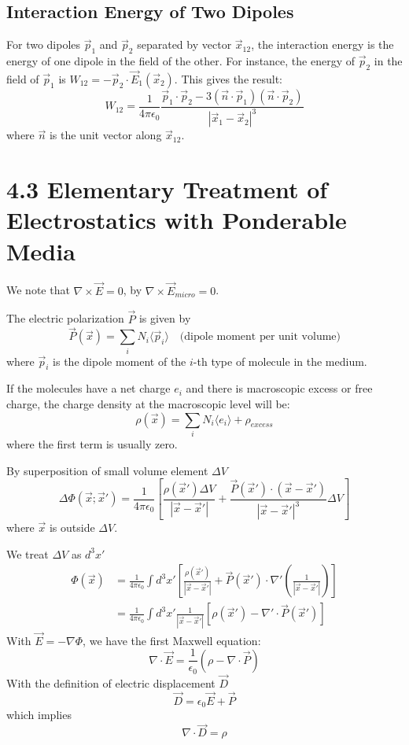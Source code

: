 \documentclass{article}
\begin{document}
	\subsection{Interaction Energy of Two Dipoles}
	For two dipoles $\vec{p}_1$ and $\vec{p}_2$ separated by vector $\vec{x}_{12}$, the interaction energy is the energy of one dipole in the field of the other. For instance, the energy of $\vec{p}_2$ in the field of $\vec{p}_1$ is $W_{12} = -\vec{p}_2 \cdot \vec{E}_1(\vec{x}_2)$. This gives the result:
	\[
	W_{12} = \frac{1}{4\pi\epsilon_0} \frac{\vec{p}_1 \cdot \vec{p}_2 - 3(\vec{n} \cdot \vec{p}_1)(\vec{n} \cdot \vec{p}_2)}{|\vec{x}_1 - \vec{x}_2|^3}
	\]
	where $\vec{n}$ is the unit vector along $\vec{x}_{12}$.
	\section*{4.3 Elementary Treatment of Electrostatics with Ponderable Media}
	
	We note that $\nabla \times \vec{E} = 0$, by $\nabla \times \vec{E}_{micro} = 0$.
	
	The electric polarization $\vec{P}$ is given by
	\[
	\vec{P}(\vec{x}) = \sum_{i} N_i \langle \vec{p}_i \rangle \quad \text{(dipole moment per unit volume)}
	\]
	where $\vec{p}_i$ is the dipole moment of the $i$-th type of molecule in the medium.
	
	If the molecules have a net charge $e_i$ and there is macroscopic excess or free charge, the charge density at the macroscopic level will be:
	\[
	\rho(\vec{x}) = \sum_{i} N_i \langle e_i \rangle + \rho_{excess}
	\]
	where the first term is usually zero.
	
	By superposition of small volume element $\Delta V$
	\[
	\Delta \Phi(\vec{x}; \vec{x}') = \frac{1}{4\pi\epsilon_0} \left[ \frac{\rho(\vec{x}') \Delta V}{|\vec{x}-\vec{x}'|} + \frac{\vec{P}(\vec{x}') \cdot (\vec{x}-\vec{x}')}{|\vec{x}-\vec{x}'|^3} \Delta V \right]
	\]
	where $\vec{x}$ is outside $\Delta V$.
	
	We treat $\Delta V$ as $d^3x'$
	\begin{align*}
		\Phi(\vec{x}) &= \frac{1}{4\pi\epsilon_0} \int d^3x' \left[ \frac{\rho(\vec{x}')}{|\vec{x}-\vec{x}'|} + \vec{P}(\vec{x}') \cdot \nabla' \left( \frac{1}{|\vec{x}-\vec{x}'|} \right) \right] \\
		&= \frac{1}{4\pi\epsilon_0} \int d^3x' \frac{1}{|\vec{x}-\vec{x}'|} \left[ \rho(\vec{x}') - \nabla' \cdot \vec{P}(\vec{x}') \right]
	\end{align*}
	With $\vec{E} = -\nabla \Phi$, we have the first Maxwell equation:
	\[
	\nabla \cdot \vec{E} = \frac{1}{\epsilon_0} (\rho - \nabla \cdot \vec{P})
	\]
	With the definition of electric displacement $\vec{D}$
	\[
	\vec{D} = \epsilon_0 \vec{E} + \vec{P}
	\]
	which implies
	\[
	\nabla \cdot \vec{D} = \rho
	\]
	
\end{document}
